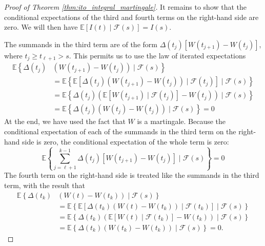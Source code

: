 \documentclass[\topdir/lecture\_notes.tex]{subfiles}
\begin{document}
\begin{optional}
\begin{proof}[Proof of Theorem \ref{thm:ito_integral_martingale}]
It remains to show that the conditional expectations of the third and fourth terms on the right-hand side are zero. We will then have \(\mathbb{E}[I(t) \mid \mathcal{F}(s)]=I(s)\).

The summands in the third term are of the form \(\Delta\left(t_{j}\right)\left[W\left(t_{j+1}\right)-W\left(t_{j}\right)\right]\), where \(t_{j} \geq t_{\ell+1}>s\). This permits us to use the law of iterated expectations
\begin{align*}
\mathbb{E}\left\{\Delta\left(t_{j}\right)\right. & \left.\left(W\left(t_{j+1}\right)-W\left(t_{j}\right)\right) \mid \mathcal{F}(s)\right\} \\
& =\mathbb{E}\left\{\mathbb{E}\left[\Delta\left(t_{j}\right)\left(W\left(t_{j+1}\right)-W\left(t_{j}\right)\right) \mid \mathcal{F}\left(t_{j}\right)\right] \mid \mathcal{F}(s)\right\} \\
& =\mathbb{E}\left\{\Delta\left(t_{j}\right)\left(\mathbb{E}\left[W\left(t_{j+1}\right) \mid \mathcal{F}\left(t_{j}\right)\right]-W\left(t_{j}\right)\right) \mid \mathcal{F}(s)\right\} \\
& =\mathbb{E}\left\{\Delta\left(t_{j}\right)\left(W\left(t_{j}\right)-W\left(t_{j}\right)\right) \mid \mathcal{F}(s)\right\}=0
\end{align*}
At the end, we have used the fact that \(W\) is a martingale. Because the conditional expectation of each of the summands in the third term on the right-hand side is zero, the conditional expectation of the whole term is zero:
\begin{equation*}
\mathbb{E}\left\{\sum_{j=\ell+1}^{k-1} \Delta\left(t_{j}\right)\left[W\left(t_{j+1}\right)-W\left(t_{j}\right)\right] \mid \mathcal{F}(s)\right\}=0
\end{equation*}
The fourth term on the right-hand side is treated like the summands in the third term, with the result that
\begin{align*}
\mathbb{E}\left\{\Delta\left(t_{k}\right)\right. & \left.\left(W(t)-W\left(t_{k}\right)\right) \mid \mathcal{F}(s)\right\} \\
& =\mathbb{E}\left\{\mathbb{E}\left[\Delta\left(t_{k}\right)\left(W(t)-W\left(t_{k}\right)\right) \mid \mathcal{F}\left(t_{k}\right)\right] \mid \mathcal{F}(s)\right\} \\
& =\mathbb{E}\left\{\Delta\left(t_{k}\right)\left(\mathbb{E}\left[W(t) \mid \mathcal{F}\left(t_{k}\right)\right]-W\left(t_{k}\right)\right) \mid \mathcal{F}(s)\right\} \\
& =\mathbb{E}\left\{\Delta\left(t_{k}\right)\left(W\left(t_{k}\right)-W\left(t_{k}\right)\right) \mid \mathcal{F}(s)\right\}=0 .
\end{align*}
\end{proof}


\end{optional}
\end{document}
